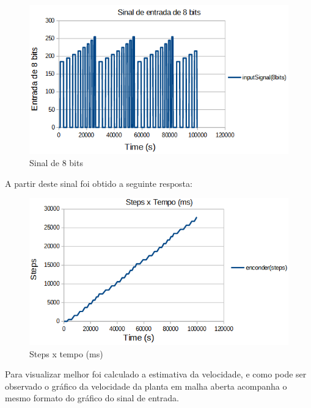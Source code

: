 \documentclass[a4paper,11pt]{article}
\begin{document}
\begin{figure}[H]
    \centering
    \includegraphics[width=\linewidth]{src/tex/img/sinal_8_bits.PNG} 
    \caption{Sinal de 8 bits}
    \label{fig:sinal8bits}
\end{figure}

A partir deste sinal foi obtido a seguinte resposta:

\begin{figure}[H]
    \centering
    \includegraphics[width=\linewidth]{src/tex/img/grafico_steps.PNG}
    \caption{Steps x tempo (ms)}
    \label{fig:steps}
\end{figure}

Para visualizar melhor foi calculado a estimativa da velocidade, e como pode ser observado o gráfico da velocidade da planta em malha aberta acompanha o mesmo formato do gráfico do sinal de entrada.
\end{document}
